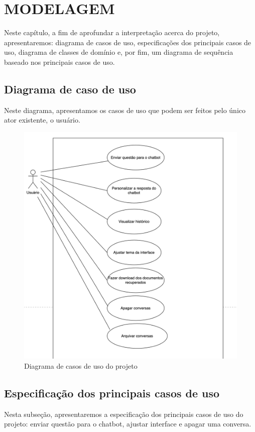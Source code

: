 \documentclass[
	12pt,				%
	openright,			%
	oneside,			    %
	a4paper,				%
	english,			%
	french,			%
	spanish,			%
	brazil			%
	]{abntex2}
\begin{document}
\chapter{MODELAGEM}
Neste capítulo, a fim de aprofundar a interpretação acerca do projeto, apresentaremos: diagrama de casos de uso, especificações dos principais casos de uso, diagrama de classes de domínio e, por fim, um diagrama de sequência baseado nos principais casos de uso.

\section{Diagrama de caso de uso}
Neste diagrama, apresentamos os casos de uso que podem ser feitos pelo único ator existente, o usuário.

\begin{figure}[h!]
    \centering
    \includegraphics[width=0.8\linewidth]{Diagrama de casos de uso.png}
    \caption{Diagrama de casos de uso do projeto}
    \label{fig:enter-label}
\end{figure}

\section{Especificação dos principais casos de uso}
Nesta subseção, apresentaremos a especificação dos principais casos de uso do projeto: enviar questão para o chatbot, ajustar interface e apagar uma conversa.
\end{document}
